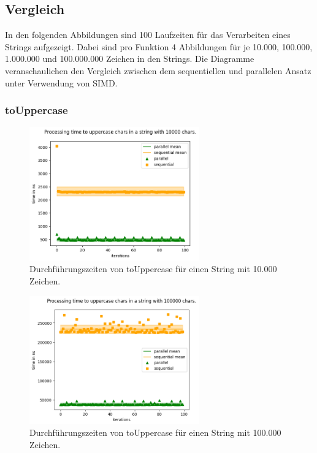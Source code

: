 \documentclass[plainarticle,zihtitle,german,final,hyperref,utf8]{zihpub}
\begin{document}
\newpage
\subsection{Vergleich}
In den folgenden Abbildungen sind 100 Laufzeiten für das Verarbeiten eines Strings aufgezeigt. Dabei sind pro Funktion 4 Abbildungen für je 10.000, 100.000, 1.000.000 und 100.000.000 Zeichen in den Strings. Die Diagramme veranschaulichen den Vergleich zwischen dem sequentiellen und parallelen Ansatz unter Verwendung von SIMD.
\subsubsection{toUppercase}
\begin{figure}[h]
	\begin{center}
		\includegraphics[width=0.65\textwidth]{images/comp_upper_10000.png}
		\caption{Durchführungszeiten von toUppercase für einen String mit 10.000 Zeichen.}
	\end{center}
\end{figure}
\begin{figure}[h]
\begin{center}
	\includegraphics[width=0.65\textwidth]{images/comp_upper_100000.png}
	\caption{Durchführungszeiten von toUppercase für einen String mit 100.000 Zeichen.}
\end{center}
\end{figure}
\end{document}
